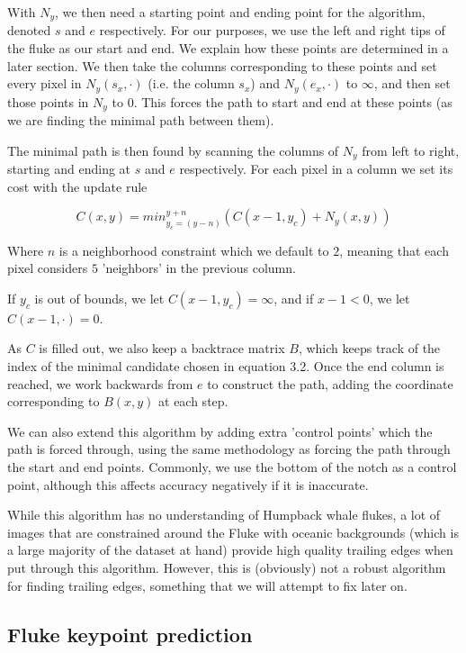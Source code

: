 With $N_y$, we then need a starting point and ending point for the algorithm, denoted $s$ and $e$ respectively. 
For our purposes, we use the left and right tips of the fluke as our start and end.
We explain how these points are determined in a later section.
We then take the columns corresponding to these points and set every pixel in $N_y(s_x,\cdot)$ (i.e. the column $s_x$) and $N_y(e_x,\cdot)$ to $\infty$,  and then set those points in $N_y$ to 0. 
This forces the path to start and end at these points (as we are finding the minimal path between them).

The minimal path is then found by scanning the columns of $N_y$ from left to right, starting and ending at $s$ and $e$ respectively. 
For each pixel in a column we set its cost with the update rule

\begin{equation} \label{te_update}
C(x,y) = min_{y_c=(y-n)}^{y+n}(C(x-1, y_c) + N_y(x,y))
\end{equation}

Where $n$ is a neighborhood constraint which we default to $2$, meaning that each pixel considers $5$ 'neighbors' in the previous column.

If $y_c$ is out of bounds, we let $C(x-1, y_c) = \infty$, and if $x - 1 < 0$, we let $C(x-1, \cdot) = 0$.

As $C$ is filled out, we also keep a backtrace matrix $B$, which keeps track of the index of the minimal candidate chosen in equation 3.2.
Once the end column is reached, we work backwards from $e$ to construct the path, adding the coordinate corresponding to $B(x,y)$ at each step.


We can also extend this algorithm by adding extra 'control points' which the path is forced through, using the same methodology as forcing the path through the start and end points.
Commonly, we use the bottom of the notch as a control point, although this affects accuracy negatively if it is inaccurate.

While this algorithm has no understanding of Humpback whale flukes, a lot of images that are constrained around the Fluke with oceanic backgrounds (which is a large majority of the dataset at hand) provide high quality trailing edges when put through this algorithm.
However, this is (obviously) not a robust algorithm for finding trailing edges, something that we will attempt to fix later on.

\subsection{Fluke keypoint prediction}

